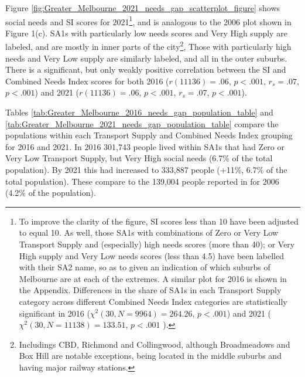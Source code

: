 \documentclass[preprint, 3p,
authoryear]{elsarticle} %
\begin{document}
Figure \ref{fig:Greater_Melbourne_2021_needs_gap_scatterplot_figure}
shows social needs and SI scores for 2021\footnote{To improve the
  clarity of the figure, SI scores less than 10 have been adjusted to
  equal 10. As well, those SA1s with combinations of Zero or Very Low
  Transport Supply and (especially) high needs scores (more than 40); or
  Very High supply and Very Low needs scores (less than 4.5) have been
  labelled with their SA2 name, so as to given an indication of which
  suburbs of Melbourne are at each of the extremes. A similar plot for
  2016 is shown in the Appendix. Differences in the share of SA1s in
  each Transport Supply category across different Combined Needs Index
  categories are statistically significant in 2016
  (\(\chi^2(30, N = 9964) = 264.26\), \(p < .001\)) and 2021
  (\(\chi^2(30, N = 11138) = 133.51\), \(p < .001\) )\footnotemark{}.},
and is analogous to the 2006 plot shown in Figure 1(c). SA1s with
particularly low needs scores and Very High supply are labeled, and are
mostly in inner parts of the city\footnote{Includings CBD, Richmond and
  Collingwood, although Broadmeadows and Box Hill are notable
  exceptions, being located in the middle suburbs and having major
  railway stations.}, Those with particularly high needs and Very Low
supply are similarly labeled, and all in the outer suburbs. There is a
significant, but only weakly positive correlation between the SI and
Combined Needs Index scores for both 2016 (\(r(11136) = .06\),
\(p < .001\), \(r_s =.07\), \(p < .001\)) and 2021 (\(r(11136) = .06\),
\(p < .001\), \(r_s =.07\), \(p < .001\)).

Tables \ref{tab:Greater_Melbourne_2016_needs_gap_population_table} and
\ref{tab:Greater_Melbourne_2021_needs_gap_population_table} compare the
populations within each Transport Supply and Combined Needs Index
grouping for 2016 and 2021. In 2016 301,743 people lived within SA1s
that had Zero or Very Low Transport Supply, but Very High social needs
(6.7\% of the total population). By 2021 this had increased to 333,887
people (+11\%, 6.7\% of the total population). These compare to the
139,004 people reported in \citet{currie2010identifying} for 2006 (4.2\%
of the population).
\end{document}
